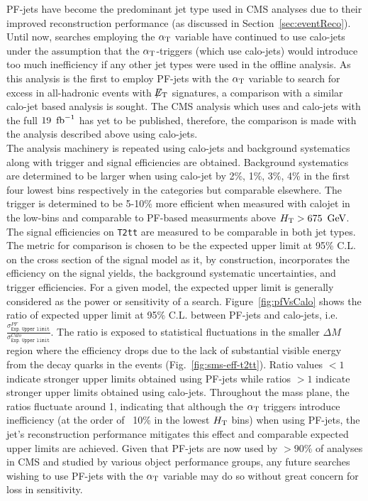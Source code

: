 PF-jets have become the predominant jet type used in CMS analyses due to their 
improved reconstruction performance (as discussed in Section~\ref{sec:eventReco}). 
Until now, searches employing the $\alpha_{\text{T}}$ variable have continued to use calo-jets 
under the assumption that the $\alpha_{\text{T}}$-triggers (which use calo-jets) would 
introduce too much inefficiency if any other jet types were used in the offline analysis.
As this analysis is the first to employ PF-jets with the $\alpha_{\text{T}}$ variable to search
for excess in all-hadronic events with $\mbox{$\not\!\!E_\text{T}$}$ signatures, a comparison with a similar 
calo-jet based analysis is sought. The CMS analysis which uses \alphat and 
calo-jets with the full $19~\mbox{\ensuremath{\,\text{fb}^\text{$-$1}}}$ has yet to be published, therefore, the comparison is made with 
the analysis described above using calo-jets.\\
\indent The analysis machinery is repeated using calo-jets and background systematics along 
with trigger and signal efficiencies are obtained. Background systematics are determined to be 
larger when using calo-jet by 2\%, 1\%, 3\%, 4\% in the first four lowest \scalht bins respectively
in the \njethigh categories but comparable elsewhere. The \alphat trigger is determined
to be 5-10\% more efficient when measured with calojet in the low-\scalht bins and comparable to PF-based 
measurments above $\mbox{$H_\text{T}$} > 675~\,\text{Ge\hspace{-.08em}V}$.  The signal efficiencies on \texttt{T2tt} are measured to
be comparable in both jet types.\\  
\indent The metric for comparison is chosen to be the expected upper limit at 95\% C.L. on the cross section of the signal model  
as it, by construction, incorporates the efficiency on the signal yields, the background systematic 
uncertainties, and trigger efficiencies. For a given model, the expected upper limit is generally 
considered as the power or sensitivity of a search. Figure~\ref{fig:pfVsCalo} shows the ratio
of expected upper limit at 95\% C.L. between PF-jets and calo-jets, i.e. 
$\frac{\sigma_{\texttt{Exp. Upper limit}}^{PF}}{\sigma_{\texttt{Exp. Upper limit}}^{Calo}}$.
The ratio is exposed to statistical fluctuations in the smaller $\Delta M$ region where the efficiency
drops due to the lack of substantial visible energy from the decay quarks in the events (Fig.~\ref{fig:sms-eff-t2tt}).
Ratio values $<1$ indicate stronger upper limits obtained using PF-jets while ratios $>1$ indicate
stronger upper limits obtained using calo-jets. Throughout the mass plane, the ratios 
fluctuate around 1, indicating that although the $\alpha_{\text{T}}$ triggers introduce inefficiency (at 
the order of ~10\% in the lowest $\mbox{$H_\text{T}$}$ bins) when using PF-jets, the jet's reconstruction 
performance mitigates this effect and comparable expected upper limits are achieved. Given that 
PF-jets are now used by $>90\%$ of analyses in CMS and studied by various object performance 
groups, any future searches wishing to use PF-jets with the $\alpha_{\text{T}}$ variable may do so without 
great concern for loss in sensitivity.  

